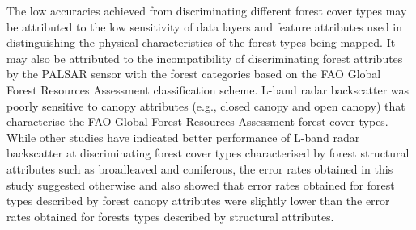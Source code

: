 The low accuracies achieved from discriminating different forest cover types may be attributed to the low sensitivity of data layers and feature attributes used in distinguishing the physical characteristics of the forest types being mapped. It may also be attributed to the incompatibility of discriminating forest attributes by the PALSAR sensor with the forest categories based on the FAO Global Forest Resources Assessment classification scheme. L-band radar backscatter was poorly sensitive to canopy attributes (e.g., closed canopy and open canopy) that characterise the FAO Global Forest Resources Assessment forest cover types. While other studies have indicated better performance of L-band radar backscatter at discriminating forest cover types characterised by forest structural attributes such as broadleaved and coniferous, the error rates obtained in this study suggested otherwise and also showed that error rates obtained for forest types described by forest canopy attributes were slightly lower than the error rates obtained for forests types described by structural attributes.
